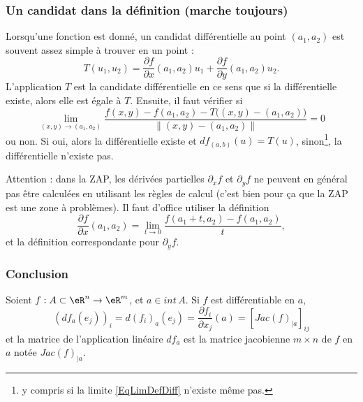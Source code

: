                     \subsubsection{Un candidat dans la définition (marche toujours)}

Lorsqu'une fonction est donné, un candidat différentielle au point $(a_1,a_2)$ est souvent assez simple à trouver en un point :
\begin{equation}
    T(u_1,u_2)=\frac{ \partial f }{ \partial x }(a_1,a_2)u_1+\frac{ \partial f }{ \partial y }(a_1,a_2)u_2.
\end{equation}
L'application $T$ est la candidate différentielle en ce sens que si la différentielle existe, alors elle est égale à $T$. Ensuite, il faut vérifier si
\begin{equation}        \label{EqLimDefDiff}
    \lim_{(x,y)\to (a_1,a_2)} \frac{f(x,y) - f(a_1,a_2) - T\big( (x,y)-(a_1,a_2) \big)}{\| (x,y)-(a_1,a_2) \|}=0
\end{equation}
ou non. Si oui, alors la différentielle existe et $df_{(a,b)}(u)=T(u)$, sinon\footnote{y compris si la limite \eqref{EqLimDefDiff} n'existe même pas.}, la différentielle n'existe pas.

Attention : dans la ZAP, les dérivées partielles $\partial_xf$ et $\partial_yf$ ne peuvent en général pas être calculées en utilisant les règles de calcul (c'est bien pour ça que la ZAP est une zone à problèmes). Il faut d'office utiliser la définition
\begin{equation}
    \frac{ \partial f }{ \partial x }(a_1,a_2)=\lim_{t\to 0}\frac{ f(a_1+t,a_2)-f(a_1,a_2) }{ t },
\end{equation}
et la définition correspondante pour $\partial_yf$.

\subsubsection*{Conclusion}
Soient $f:A\subset \eR^n \rightarrow \eR^m$, et $a\in int\,A$. Si $f$ est différentiable en $a$, $$ (df_a (e_j))_i = d(f_i)_a(e_j) =\frac{\partial f_i}{\partial x_j}(a)= [Jac(f)_{|a}]_{ij}$$ et la matrice de l'application linéaire $df_a$ est la matrice jacobienne $m\times n$ de $f$ en $a$ notée $Jac(f)_{|a}$.

